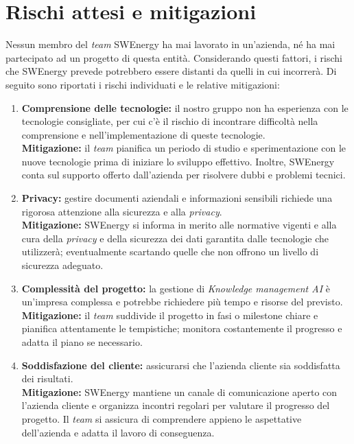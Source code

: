 \section{Rischi attesi e mitigazioni}

Nessun membro del \textit{team} SWEnergy ha mai lavorato in un'azienda, né ha
mai partecipato ad un progetto di questa entità. Considerando questi fattori, i
rischi che SWEnergy prevede potrebbero essere distanti da quelli in cui
incorrerà. 
Di seguito sono riportati i rischi individuati e le relative mitigazioni:
\begin{enumerate}

\item \textbf{Comprensione delle tecnologie:} il nostro gruppo non ha esperienza 
con le tecnologie consigliate, per cui c'è il rischio di incontrare 
difficoltà nella comprensione e nell'implementazione di queste tecnologie. \\
\textbf{Mitigazione:} il \textit{team} pianifica un periodo di studio e 
sperimentazione con 
le nuove tecnologie prima di iniziare lo sviluppo effettivo. Inoltre, SWEnergy
conta sul supporto offerto dall'azienda per risolvere dubbi e problemi tecnici.

\item \textbf{Privacy:} gestire documenti aziendali e 
informazioni sensibili richiede una rigorosa attenzione alla sicurezza e alla 
\textit{privacy}. \\
\textbf{Mitigazione:} SWEnergy si informa in merito alle normative vigenti
e alla
cura della \textit{privacy} e della sicurezza dei dati garantita dalle tecnologie che
utilizzerà; eventualmente scartando quelle che non offrono un livello di
sicurezza adeguato.

\item \textbf{Complessità del progetto:} la gestione di \textit{Knowledge 
management AI} è
un'impresa complessa e potrebbe richiedere più tempo e risorse del previsto. \\
\textbf{Mitigazione:} il \textit{team} suddivide il progetto in fasi o 
milestone chiare e 
pianifica attentamente le tempistiche; monitora costantemente il progresso e
adatta il piano se necessario. 

\item \textbf{Soddisfazione del cliente:} assicurarsi che l'azienda cliente sia 
soddisfatta dei risultati. \\
\textbf{Mitigazione:} SWEnergy mantiene un canale di comunicazione aperto con 
l'azienda 
cliente e organizza incontri regolari per valutare il progresso del progetto. 
Il \textit{team} si assicura di comprendere appieno le aspettative dell'azienda 
e adatta il lavoro di conseguenza.
\end{enumerate}
